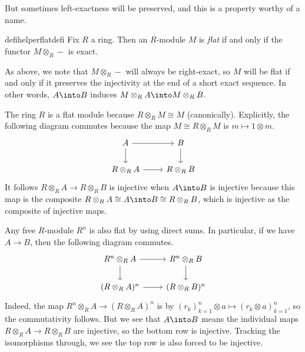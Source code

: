 But sometimes left-exactness will be preserved, and this is a property worthy of a name.
\begin{restatable}[Flat]{defihelper}{flatdefi} 
	Fix $R$ a ring. Then an $R$-module $M$ is \textit{flat} if and only if the functor $M\otimes_R-$ is exact.
\end{restatable}
\begin{remark} \label{rem:easierflat}
	As above, we note that $M\otimes_R-$ will always be right-exact, so $M$ will be flat if and only if it preserves the injectivity at the end of a short exact sequence. In other words, $A\into B$ induces $M\otimes_RA\into M\otimes_RB$.
\end{remark}
\begin{example}
	The ring $R$ is a flat module because $R\otimes_RM\cong M$ (canonically). Explicitly, the following diagram commutes because the map $M\cong R\otimes_RM$ is $m\mapsto1\otimes m$.
	\[\begin{tikzcd}
		A & B \\
		{R\otimes_RA} & {R\otimes_RB}
		\arrow[from=1-1, to=1-2]
		\arrow[from=2-1, to=2-2]
		\arrow[from=1-1, to=2-1]
		\arrow[from=1-2, to=2-2]
	\end{tikzcd}\]
	It follows $R\otimes_RA\to R\otimes_RB$ is injective when $A\into B$ is injective because this map is the composite $R\otimes_RA\cong A\into B\cong R\otimes_RB$, which is injective as the composite of injective maps.
\end{example}
\begin{example} \label{ex:freeisflat}
	Any free $R$-module $R^n$ is also flat by using direct sums. In particular, if we have $A\to B$, then the following diagram commutes.
	\[\begin{tikzcd}
		{R^n\otimes_RA} & {R^n\otimes_RB} \\
		{(R\otimes_R A)^n} & {(R\otimes_R B)^n}
		\arrow[from=1-1, to=1-2]
		\arrow[from=2-1, to=2-2]
		\arrow[from=1-1, to=2-1]
		\arrow[from=1-2, to=2-2]
	\end{tikzcd}\]
	Indeed, the map $R^n\otimes_R A\to(R\otimes_R A)^n$ is by $(r_k)_{k=1}^n\otimes a\mapsto(r_k\otimes a)_{k=1}^n$, so the commutativity follows. But we see that $A\into B$ means the individual maps $R\otimes_RA\to R\otimes_RB$ are injective, so the bottom row is injective. Tracking the isomorphisms through, we see the top row is also forced to be injective.
\end{example}

